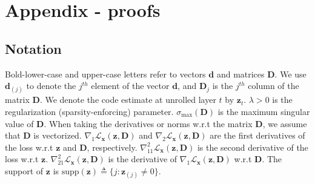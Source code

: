 \documentclass[10pt]{article} %
\newcommand{\D}{{\bm D}}
\newcommand{\x}{{\bm x}}
\newcommand{\z}{{\bm z}}
\newcommand{\Loss}{\mathcal{L}}
\begin{document}



\appendix
\section{Appendix - proofs}
\label{appendix}


%
\subsection{Notation}
%
Bold-lower-case and upper-case letters refer to vectors ${\bm d}$ and matrices ${\D}$. We use ${\bm d}_{(j)}$ to denote the $j^{th}$ element of the vector ${\bm d}$, and ${\D}_j$ is the $j^{th}$ column of the matrix ${\D}$. We denote the code estimate at unrolled layer $t$ by $\z_t$. $\lambda > 0$ is the regularization (sparsity-enforcing) parameter. $\sigma_{\text{max}}{({\D})}$ is the maximum singular value of ${\D}$. When taking the derivatives or norms w.r.t the matrix $\D$, we assume that $\D$ is vectorized. $\nabla_1 \Loss_{\x}(\z, \D)$ and $\nabla_2 \Loss_{\x}(\z, \D)$ are the first derivatives of the loss w.r.t $\z$ and $\D$, respectively. $\nabla_{11}^2 \Loss_{\x}(\z, \D)$ is the second derivative of the loss w.r.t $\z$. $\nabla_{21}^2 \Loss_{\x}(\z, \D)$ is the derivative of $\nabla_{1} \Loss_{\x}(\z, \D)$ w.r.t $\D$. The support of $\z$ is $\text{supp}(\z) \triangleq \{j \colon \z_{(j)} \neq 0\}$.
%
%
\end{document}

